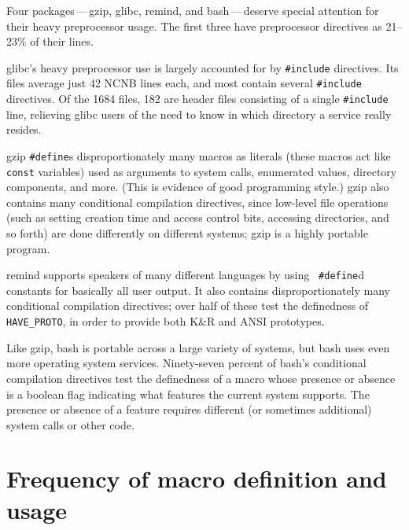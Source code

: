 \documentclass[11pt]{article}
\begin{document}
Four packages\,---\,gzip, glibc, remind, and bash\,---\,deserve special
attention for their heavy preprocessor usage.  The first three have
preprocessor directives as 21--23\% of their lines.

glibc's heavy preprocessor use is largely accounted for by {\tt \#include}
directives.  Its files average just 42 NCNB lines each, and most contain
several {\tt \#include} directives.  Of the 1684 files, 182 are header
files consisting of a single {\tt \#include} line, relieving glibc users of
the need to know in which directory a service really resides.

gzip {\tt \#define}s disproportionately many macros as literals (these
macros act like {\tt const} variables) used as arguments to system calls,
enumerated values, directory components, and more.  (This is evidence of
good programming style.)  gzip also contains many conditional compilation
directives, since low-level file operations (such as setting creation time
and access control bits, accessing directories, and so forth) are done
differently on different systems; gzip is a highly portable program.

remind supports speakers of many different languages by using {\tt
\#define}d constants for basically all user output.  It also contains
disproportionately many conditional compilation directives; over half of
these test the definedness of \verb|HAVE_PROTO|, in order to provide both
K\&R and ANSI prototypes.

Like gzip, bash is portable across a large variety of systems, but bash
uses even more operating system services.  Ninety-seven percent of bash's
conditional compilation directives test the definedness of a macro whose
presence or absence is a boolean flag indicating what features the current
system supports.  The presence or absence of a feature requires different
(or sometimes additional) system calls or other code.


\section{Frequency of macro definition and usage}
\label{sec:usage}


%
%
\end{document}
